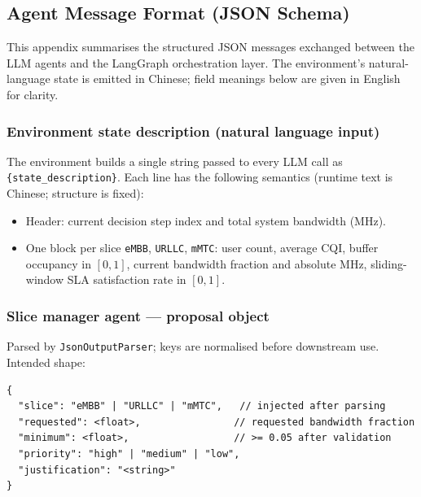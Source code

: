 \subsection*{Agent Message Format (JSON Schema)}
{}

\noindent
This appendix summarises the structured JSON messages exchanged between
the LLM agents and the LangGraph orchestration layer.
The environment's natural-language state is emitted in Chinese; field meanings
below are given in English for clarity.

\subsubsection*{Environment state description (natural language input)}

The environment builds a single string passed to every LLM call as
\texttt{\{state\_description\}}. Each line has the following semantics
(runtime text is Chinese; structure is fixed):

\begin{itemize}\setlength{\itemsep}{2pt}
  \item Header: current decision step index and total system bandwidth (MHz).
  \item One block per slice \texttt{eMBB}, \texttt{URLLC}, \texttt{mMTC}:
        user count, average CQI, buffer occupancy in $[0,1]$, current bandwidth
        fraction and absolute MHz, sliding-window SLA satisfaction rate in
        $[0,1]$.
\end{itemize}

\subsubsection*{Slice manager agent --- proposal object}

Parsed by \texttt{JsonOutputParser}; keys are normalised before downstream use.
Intended shape:

\begin{lstlisting}[basicstyle=\footnotesize\ttfamily, breaklines=true, columns=fullflexible, frame=single]
{
  "slice": "eMBB" | "URLLC" | "mMTC",   // injected after parsing
  "requested": <float>,                // requested bandwidth fraction
  "minimum": <float>,                  // >= 0.05 after validation
  "priority": "high" | "medium" | "low",
  "justification": "<string>"
}
\end{lstlisting}

